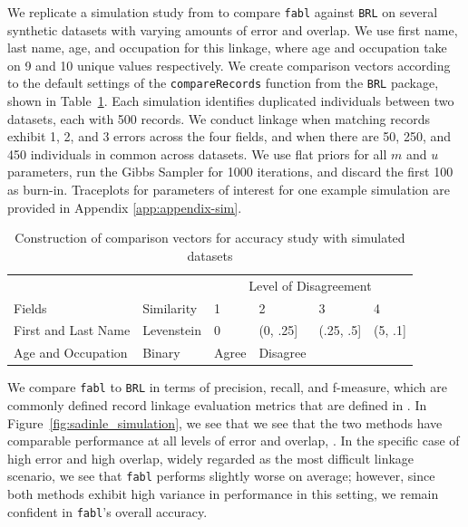 \documentclass[12pt,letterpaper]{article}
\newcommand{\1}[1]{\mathbb{I}\!\left[#1\right]} %
\begin{document}
We replicate a simulation study from \cite{sadinle_bayesian_2017} to compare \texttt{fabl} against \texttt{BRL} on several synthetic datasets with varying amounts of error and overlap. We use first name, last name, age, and occupation for this linkage, where age and occupation take on 9 and 10 unique values respectively. We create comparison vectors according to the default settings of the \texttt{compareRecords} function from the \texttt{BRL} package, shown in Table~\ref{Tab:sadinle_simulation_cutoffs}. Each simulation identifies duplicated individuals between two datasets, each with 500 records. We conduct linkage when matching records exhibit 1, 2, and 3 errors across the four fields, and when there are 50, 250, and 450 individuals in common across datasets. We use flat priors for all $m$ and $u$ parameters, run the Gibbs Sampler for 1000 iterations, and discard the first 100 as burn-in. Traceplots for parameters of interest for one example simulation are provided in Appendix \ref{app:appendix-sim}.

\begin{table}[h!]
	\centering
	\begin{tabular}[t]{ll|llll}
		\hline
		\multicolumn{2}{c|}{ } & \multicolumn{4}{c}{Level of Disagreement} \\
		\cline{3-6}
		Fields & Similarity & 1 & 2 & 3 & 4\\
		\hline
		First and Last Name & Levenstein & 0 & (0, .25] & (.25, .5] & (5, .1]\\
		\hline
		Age and Occupation & Binary & Agree & Disagree &  & \\
		\hline
	\end{tabular}
\caption{Construction of comparison vectors for accuracy study with simulated datasets}
\label{Tab:sadinle_simulation_cutoffs}
\end{table}
	
We compare \texttt{fabl} to \texttt{BRL} in terms of precision, recall, and f-measure, which are commonly defined record linkage evaluation metrics that are defined in \citep{christen_2012}. In Figure~\ref{fig:sadinle_simulation}, we see that we see that the two methods have comparable performance at all levels of error and overlap, . In the specific case of high error and high overlap, widely regarded as the most difficult linkage scenario, we see that \texttt{fabl} performs slightly worse on average; however, since both methods exhibit high variance in performance in this setting, we remain confident in \texttt{fabl}'s overall accuracy. 
\end{document}
